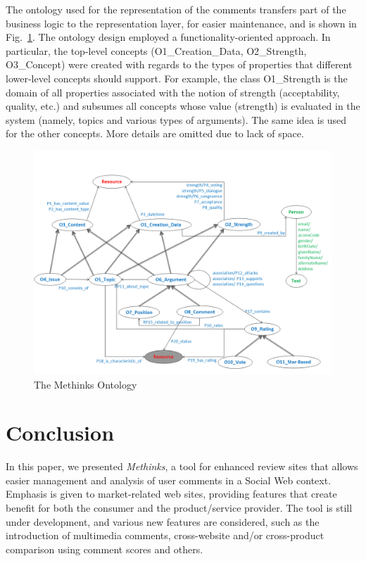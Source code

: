 \documentclass[runningheads,a4paper]{llncs}
\makeatletter
\def\maxwidth#1{\ifdim\Gin@nat@width>#1 #1\else\Gin@nat@width\fi}
\makeatother
\begin{document}
The ontology used for the representation of the comments transfers part of the business logic to the representation layer, for easier maintenance, and is shown in Fig.~\ref{_Ref490744387}. The ontology design employed a functionality-oriented approach. In particular, the top-level concepts (O1\_Creation\_Data, O2\_Strength, O3\_Concept) were created with regards to the types of properties that different lower-level concepts should support. For example, the class O1\_Strength is the domain of all properties associated with the notion of strength (acceptability, quality, etc.) and subsumes all concepts whose value (strength) is evaluated in the system (namely, topics and various types of arguments). The same idea is used for the other concepts. More details are omitted due to lack of space.
\begin{figure}[h!]
\centering
\includegraphics[width=\maxwidth{\textwidth}]{./img/image4.png}
\cprotect\caption{ The Methinks Ontology}
\label{_Ref490744387}
\end{figure}


\section{Conclusion}

In this paper, we presented {\em Methinks}, a tool for enhanced review sites that allows easier management and analysis of user comments in a Social Web context. Emphasis is given to market-related web sites, providing features that create benefit for both the consumer and the product/service provider. The tool is still under development, and various new features are considered, such as the introduction of multimedia comments, cross-website and/or cross-product comparison using comment scores and others.
\end{document}
